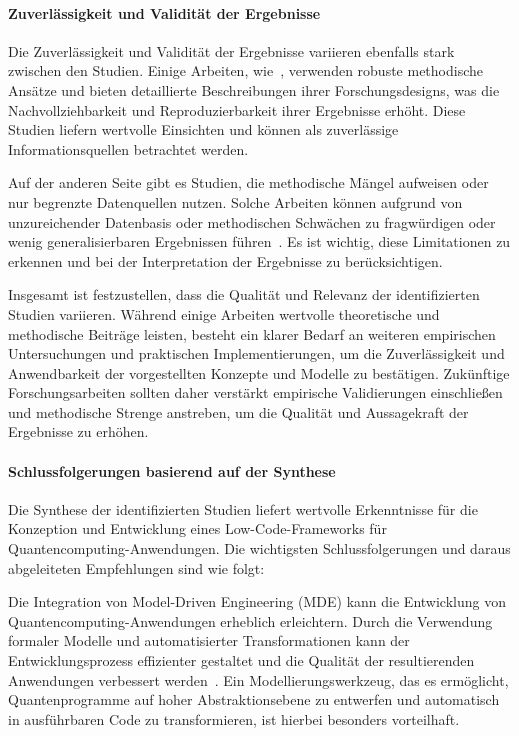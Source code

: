 \paragraph{Zuverlässigkeit und Validität der Ergebnisse}
Die Zuverlässigkeit und Validität der Ergebnisse variieren ebenfalls stark zwischen den Studien. Einige 
Arbeiten, wie~\cite{Ahmad_2023}, verwenden robuste methodische Ansätze und bieten detaillierte Beschreibungen 
ihrer Forschungsdesigns, was die Nachvollziehbarkeit und Reproduzierbarkeit ihrer Ergebnisse erhöht. Diese Studien 
liefern wertvolle Einsichten und können als zuverlässige Informationsquellen betrachtet werden.

Auf der anderen Seite gibt es Studien, die methodische Mängel aufweisen oder nur begrenzte Datenquellen nutzen. Solche 
Arbeiten können aufgrund von unzureichender Datenbasis oder methodischen Schwächen zu fragwürdigen oder wenig 
generalisierbaren Ergebnissen führen~\cite{Khorram_2020}. Es ist wichtig, diese Limitationen zu erkennen und bei 
der Interpretation der Ergebnisse zu berücksichtigen.

Insgesamt ist festzustellen, dass die Qualität und Relevanz der identifizierten Studien variieren. Während einige 
Arbeiten wertvolle theoretische und methodische Beiträge leisten, besteht ein klarer Bedarf an weiteren empirischen 
Untersuchungen und praktischen Implementierungen, um die Zuverlässigkeit und Anwendbarkeit der vorgestellten Konzepte 
und Modelle zu bestätigen. Zukünftige Forschungsarbeiten sollten daher verstärkt empirische Validierungen einschließen 
und methodische Strenge anstreben, um die Qualität und Aussagekraft der Ergebnisse zu erhöhen. 

\paragraph{Schlussfolgerungen basierend auf der Synthese}

Die Synthese der identifizierten Studien liefert wertvolle Erkenntnisse für die Konzeption und Entwicklung eines Low-Code-Frameworks 
für Quantencomputing-Anwendungen. Die wichtigsten Schlussfolgerungen und daraus abgeleiteten Empfehlungen sind wie folgt:

Die Integration von Model-Driven Engineering (MDE) kann die Entwicklung von Quantencomputing-Anwendungen erheblich erleichtern. 
Durch die Verwendung formaler Modelle und automatisierter Transformationen kann der Entwicklungsprozess effizienter gestaltet 
und die Qualität der resultierenden Anwendungen verbessert werden~\cite{France_2007, Selic_2003}. Ein Modellierungswerkzeug, 
das es ermöglicht, Quantenprogramme auf hoher Abstraktionsebene zu entwerfen und automatisch in ausführbaren Code zu transformieren, 
ist hierbei besonders vorteilhaft.

